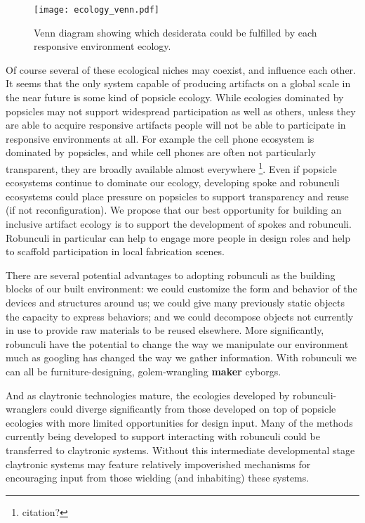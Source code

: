 \begin{figure}[tb]
  \centering
    \texttt{[image: ecology\_venn.pdf]}
  \caption{Venn diagram showing which desiderata could be fulfilled by each responsive environment ecology.}
  \label{fig:ecology_venn}
\end{figure}

Of course several of these ecological niches may coexist, and influence each other. 
It seems that the only system capable of producing artifacts on a global scale in the near future is some kind of popsicle ecology. 
While ecologies dominated by popsicles may not support widespread participation as well as others, unless they are able to acquire responsive artifacts people will not be able to participate in responsive environments at all. 
For example the cell phone ecosystem is dominated by popsicles, and while cell phones are often not particularly transparent, they are broadly available almost everywhere%
\footnote{citation?}.
Even if popsicle ecosystems continue to dominate our ecology, developing spoke and robunculi ecosystems could place pressure on popsicles to support transparency and reuse (if not reconfiguration). 
We propose that our best opportunity for building an inclusive artifact ecology is to support the development of spokes and robunculi. 
Robunculi in particular can help to engage more people in design roles and help to scaffold participation in local fabrication scenes.

There are several potential advantages to adopting robunculi as the building blocks of our built environment: we could customize the form and behavior of the devices and structures around us; we could give many previously static objects the capacity to express behaviors; and we could decompose objects not currently in use to provide raw materials to be reused elsewhere. 
More significantly, robunculi have the potential to change the way we manipulate our environment much as googling has changed the way we gather information. 
With robunculi we can all be furniture{}-designing, golem{}-wrangling {\bf maker} cyborgs.

And as claytronic technologies mature, the ecologies developed by robunculi-wranglers could diverge significantly from those developed on top of popsicle ecologies with more limited opportunities for design input. 
Many of the methods currently being developed to support interacting with robunculi could be transferred to claytronic systems. 
Without this intermediate developmental stage claytronic systems may feature relatively impoverished mechanisms for encouraging input from those wielding (and inhabiting) these systems.

